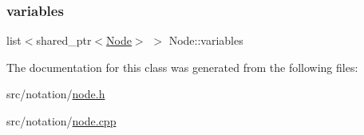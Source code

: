 \mbox{\label{class_node_a350b631f3a9192bfa23bc266f6b8da02}} 
\subsubsection{\texorpdfstring{variables}{variables}}
{\footnotesize\ttfamily list$<$shared\+\_\+ptr$<$\hyperlink{class_node}{Node}$>$ $>$ Node\+::variables}



The documentation for this class was generated from the following files\+:\begin{DoxyCompactItemize}
\item 
src/notation/\hyperlink{node_8h}{node.\+h}\item 
src/notation/\hyperlink{node_8cpp}{node.\+cpp}\end{DoxyCompactItemize}
